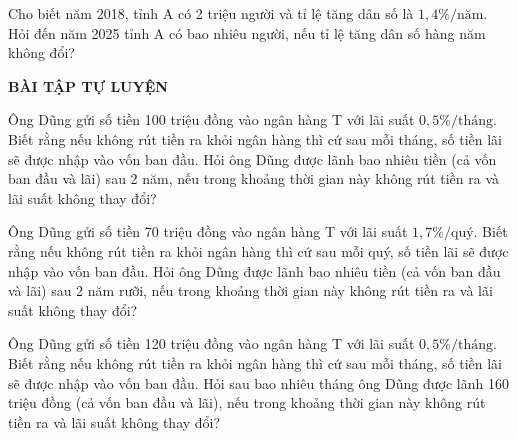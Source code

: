 %
\begin{vd}%
	Cho biết năm 2018, tỉnh A có 2 triệu người và tỉ lệ tăng dân số là $1,4\% / \mbox{năm}$. Hỏi đến năm 2025 tỉnh A có bao nhiêu người, nếu tỉ lệ tăng dân số hàng năm không đổi?
\end{vd}
%
\begin{center}
	\textbf{BÀI TẬP TỰ LUYỆN}
\end{center}
\begin{bt}%
	Ông Dũng gửi số tiền 100 triệu đồng vào ngân hàng T với lãi suất $0,5\% / \mbox{tháng}$. Biết rằng nếu không rút tiền ra khỏi ngân hàng thì cứ sau mỗi tháng, số tiền lãi sẽ được nhập vào vốn ban đầu. Hỏi ông Dũng được lãnh bao nhiêu tiền (cả vốn ban đầu và lãi) sau 2 năm, nếu trong khoảng thời gian này không rút tiền ra và lãi suất không thay đổi?
\end{bt}
%
\begin{bt}%
	Ông Dũng gửi số tiền 70 triệu đồng vào ngân hàng T với lãi suất $1,7\% / \mbox{quý}$. Biết rằng nếu không rút tiền ra khỏi ngân hàng thì cứ sau mỗi quý, số tiền lãi sẽ được nhập vào vốn ban đầu. Hỏi ông Dũng được lãnh bao nhiêu tiền (cả vốn ban đầu và lãi) sau 2 năm rưỡi, nếu trong khoảng thời gian này không rút tiền ra và lãi suất không thay đổi?
\end{bt}
%
\begin{bt}%
	Ông Dũng gửi số tiền 120 triệu đồng vào ngân hàng T với lãi suất $0,5\% / \mbox{tháng}$. Biết rằng nếu không rút tiền ra khỏi ngân hàng thì cứ sau mỗi tháng, số tiền lãi sẽ được nhập vào vốn ban đầu. Hỏi sau bao nhiêu tháng ông Dũng được lãnh 160 triệu đồng (cả vốn ban đầu và lãi), nếu trong khoảng thời gian này không rút tiền ra và lãi suất không thay đổi?
\end{bt}
